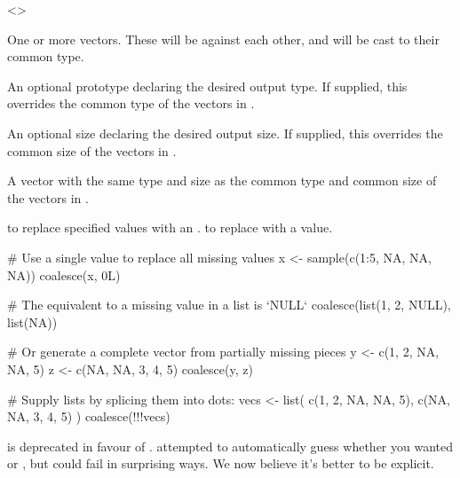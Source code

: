 \documentclass[a4paper]{book}
\begin{document}
%
\begin{Arguments}
\begin{ldescription}
\item[\code{...}] <>

One or more vectors. These will be
 against each other, and will be
cast to their common type.

\item[\code{.ptype}] An optional prototype declaring the desired output type. If
supplied, this overrides the common type of the vectors in .

\item[\code{.size}] An optional size declaring the desired output size. If supplied,
this overrides the common size of the vectors in .
\end{ldescription}
\end{Arguments}
%
\begin{Value}
A vector with the same type and size as the common type and common
size of the vectors in .
\end{Value}
%
\begin{SeeAlso}
 to replace specified values with an .
 to replace  with a value.
\end{SeeAlso}
%
\begin{Examples}
\begin{ExampleCode}
# Use a single value to replace all missing values
x <- sample(c(1:5, NA, NA, NA))
coalesce(x, 0L)

# The equivalent to a missing value in a list is `NULL`
coalesce(list(1, 2, NULL), list(NA))

# Or generate a complete vector from partially missing pieces
y <- c(1, 2, NA, NA, 5)
z <- c(NA, NA, 3, 4, 5)
coalesce(y, z)

# Supply lists by splicing them into dots:
vecs <- list(
  c(1, 2, NA, NA, 5),
  c(NA, NA, 3, 4, 5)
)
coalesce(!!!vecs)
\end{ExampleCode}
\end{Examples}
%
\begin{Description}
\strong{[Deprecated]}

 is deprecated in favour of . 
attempted to automatically guess whether you wanted  or ,
but could fail in surprising ways. We now believe it's better to be explicit.
\end{Description}
\end{document}
